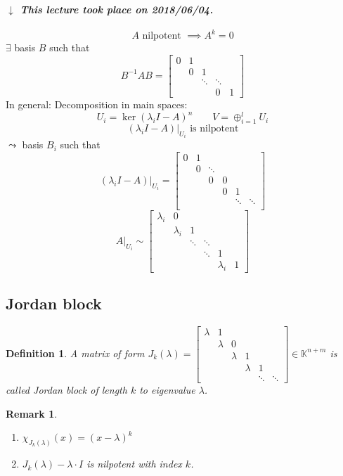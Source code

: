 \documentclass{article}
\newtheorem{definition}{Definition}  \numberwithin{definition}{section}
\newtheorem{remark}{Remark}  \numberwithin{remark}{section}
\newcommand{\dateref}[1]{%
  \begin{mdframed}[backgroundcolor=gray!10,innerbottommargin=0pt,innertopmargin=0pt]
    \paragraph{\textit{$\downarrow$ This lecture took place on #1.}}%
  \end{mdframed}%
}
\begin{document}
\dateref{2018/06/04}

\[ A \text{ nilpotent } \implies A^k = 0 \]
$\exists$ basis $B$ such that 
\[ B^{-1}AB = \begin{bmatrix} 0 & 1 & & & \\ & 0 & 1 & & \\ & & \ddots & \ddots & \\ & & & 0 & 1 \end{bmatrix} \]
In general:
Decomposition in main spaces:
\[ U_i = \ker(\lambda_i I - A)^n \qquad V = \oplus_{i=1}^l U_i \] %
\[ (\lambda_i I - A)|_{U_i} \text{ is nilpotent} \]
$\leadsto$ basis $B_i$ such that
\[ (\lambda_i I - A)|_{U_i} = \begin{bmatrix}
  0 & 1 & & & & \\
  & 0 & \ddots & & & \\
  & & 0 & 0 & & \\
  & & & 0 & 1 & \\
  & & & & \ddots & \ddots \\
\end{bmatrix} \]
\[
  A|_{U_i} \sim
  \begin{bmatrix}
    \lambda_i & 0 & & & & \\
    & \lambda_i & 1 & & & \\
    & & \ddots & \ddots & & \\
    & & & \ddots & 1 & \\
    & & & & \lambda_i & 1
  \end{bmatrix}
\]

\subsection{Jordan block}

\begin{definition} %
  A matrix of form $J_k(\lambda) = \begin{bmatrix}
    \lambda & 1 & & & & \\
    & \lambda & 0 & & & \\
    & & \lambda & 1 & & \\
    & & & \lambda & 1 & \\
    & & & & \ddots & \ddots
  \end{bmatrix} \in \mathbb K^{n+m}$
  is called \emph{Jordan block} of length $k$ to eigenvalue $\lambda$.
\end{definition}

\begin{remark}
  \begin{enumerate}
    \item $\chi_{J_k(\lambda)}(x) = (x - \lambda)^k$
    \item $J_k(\lambda) - \lambda \cdot I$ is nilpotent with index $k$.
  \end{enumerate}
\end{remark}
\end{document}
